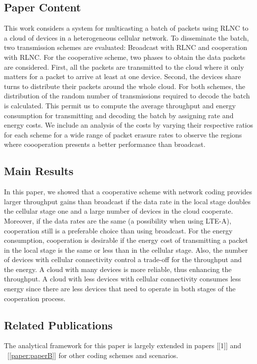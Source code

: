 \subsection*{Paper Content}
This work considers a system for multicasting a batch of packets using \ac{RLNC} to a cloud of devices in a heterogeneous cellular network. To disseminate the batch, two transmission schemes are evaluated: Broadcast with \ac{RLNC} and cooperation with \ac{RLNC}. For the cooperative scheme, two phases to obtain the data packets are considered. First, all the packets are transmitted to the cloud where it only matters for a packet to arrive at least at one device. Second, the devices share turns to distribute their packets around the whole cloud. For both schemes, the distribution of the random number of transmissions required to decode the batch is calculated. This permit us to compute the average throughput and energy consumption for transmitting and decoding the batch by assigning rate and energy costs. We include an analysis of the costs by varying their respective ratios for each scheme for a wide range of packet erasure rates to observe the regions where coooperation presents a better performance than broadcast.

\subsection*{Main Results}
In this paper, we showed that a cooperative scheme with network coding provides larger throughput gains than broadcast if the data rate in the local stage doubles the cellular stage one and a large number of devices in the cloud cooperate. Moreover, if the data rates are the same (a possibility when using \ac{LTE-A}), cooperation still is a preferable choice than using broadcast. For the energy consumption, cooperation is desirable if the energy cost of transmitting a packet in the local stage is the same or less than in the cellular stage. Also, the number of devices with cellular connectivity control a trade-off for the throughput and the energy. A cloud with many devices is more reliable, thus enhancing the throughput. A cloud with less devices with cellular connectivity consumes less energy since there are less devices that need to operate in both stages of the cooperation process.

\subsection*{Related Publications}
The analytical framework for this paper is largely extended in papers [{[1]}] and ~[\ref{paper:paperB}] for other coding schemes and scenarios.

